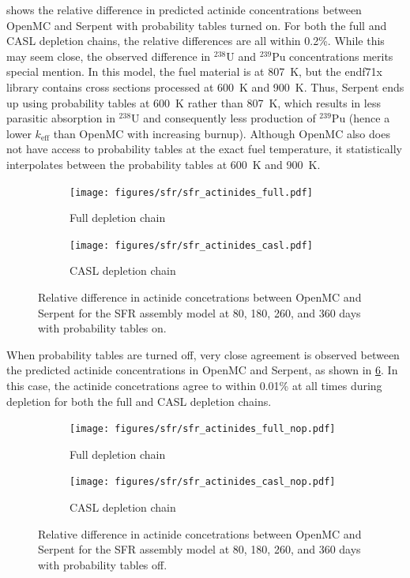 \documentclass[3p,authoryear]{elsarticle}
\begin{document}
 shows the relative difference in predicted actinide
concentrations between OpenMC and Serpent with probability tables turned on. For
both the full and CASL depletion chains, the relative differences are all within
0.2\%. While this may seem close, the observed difference in $^{238}$U and
$^{239}$Pu concentrations merits special mention. In this model, the fuel
material is at \SI{807}{\kelvin}, but the endf71x library contains cross
sections processed at \SI{600}{\kelvin} and \SI{900}{\kelvin}. Thus, Serpent
ends up using probability tables at \SI{600}{\kelvin} rather than
\SI{807}{\kelvin}, which results in less parasitic absorption in $^{238}$U and
consequently less production of $^{239}$Pu (hence a lower $k_\text{eff}$ than
OpenMC with increasing burnup). Although OpenMC also does not have access to
probability tables at the exact fuel temperature, it statistically interpolates
between the probability tables at \SI{600}{\kelvin} and \SI{900}{\kelvin}.
\begin{figure}[H]
  \centering
  \begin{subfigure}[t]{0.45\textwidth}
    \texttt{[image: figures/sfr/sfr\_actinides\_full.pdf]}
    \caption{Full depletion chain}
    \label{fig:sfr-actinides-full}
  \end{subfigure}
  \hspace{0.05\textwidth}
  \begin{subfigure}[t]{0.45\textwidth}
    \texttt{[image: figures/sfr/sfr\_actinides\_casl.pdf]}
    \caption{CASL depletion chain}
    \label{fig:sfr-actinides-casl}
  \end{subfigure}
  \caption{Relative difference in actinide concetrations between OpenMC and
  Serpent for the SFR assembly model at 80, 180, 260, and 360 days with
  probability tables on.}
  \label{fig:sfr-actinides}
\end{figure}

When probability tables are turned off, very close agreement is observed between
the predicted actinide concentrations in OpenMC and Serpent, as shown in
\cref{fig:sfr-actinides-nop}. In this case, the actinide concetrations agree to
within 0.01\% at all times during depletion for both the full and CASL depletion
chains.
\begin{figure}[H]
  \centering
  \begin{subfigure}[t]{0.45\textwidth}
    \texttt{[image: figures/sfr/sfr\_actinides\_full\_nop.pdf]}
    \caption{Full depletion chain}
    \label{fig:sfr-actinides-full-nop}
  \end{subfigure}
  \hspace{0.05\textwidth}
  \begin{subfigure}[t]{0.45\textwidth}
    \texttt{[image: figures/sfr/sfr\_actinides\_casl\_nop.pdf]}
    \caption{CASL depletion chain}
    \label{fig:sfr-actinides-casl-nop}
  \end{subfigure}
  \caption{Relative difference in actinide concetrations between OpenMC and
  Serpent for the SFR assembly model at 80, 180, 260, and 360 days with
  probability tables off.}
  \label{fig:sfr-actinides-nop}
\end{figure}
\end{document}
